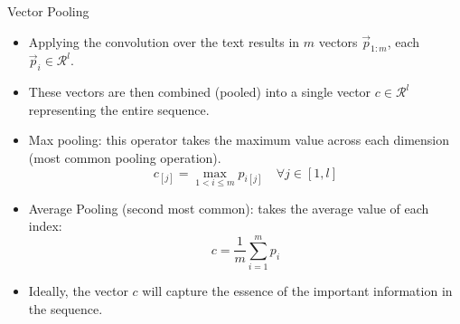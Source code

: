 \begin{frame}{Vector Pooling}
\begin{scriptsize}
\begin{itemize}
\item Applying the convolution over the text results in $m$ vectors $\vec{p}_{1:m}$, each $\vec{p}_i \in \mathcal{R}^l$.
\item These vectors are then combined (pooled) into a single vector $c \in \mathcal{R}^l$ representing the entire sequence.
\item Max pooling: this operator takes the maximum value across each dimension (most common pooling operation).
\begin{displaymath}
c_[j]= \max_{1< i \leq m} p_{i[j]} \quad \forall j \in [1,l]
\end{displaymath}

\item Average Pooling (second most common): takes the average value of each index:
\begin{displaymath}
c = \frac{1}{m} \sum_{i=1}^{m}p_i
\end{displaymath}

\item Ideally, the vector $c$ will capture the essence of the important information in the sequence. 

\end{itemize}
\end{scriptsize}
\end{frame}



